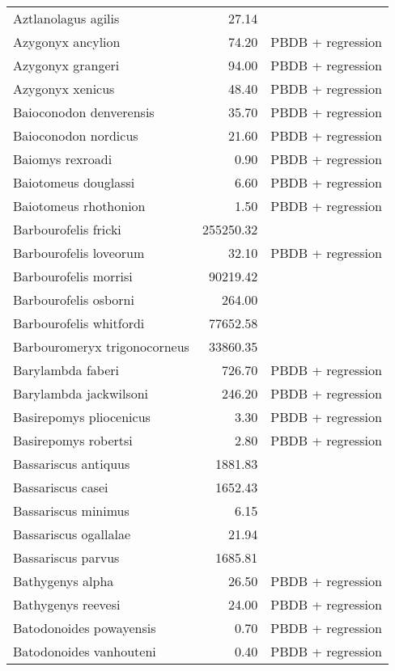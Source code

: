 \begin{table}[ht]
\begin{tabular}{lrl}
  Aztlanolagus agilis & 27.14 & \cite{Smith2004} \\ 
  Azygonyx ancylion & 74.20 & PBDB + regression \\ 
  Azygonyx grangeri & 94.00 & PBDB + regression \\ 
  Azygonyx xenicus & 48.40 & PBDB + regression \\ 
  Baioconodon denverensis & 35.70 & PBDB + regression \\ 
  Baioconodon nordicus & 21.60 & PBDB + regression \\ 
  Baiomys rexroadi & 0.90 & PBDB + regression \\ 
  Baiotomeus douglassi & 6.60 & PBDB + regression \\ 
  Baiotomeus rhothonion & 1.50 & PBDB + regression \\ 
  Barbourofelis fricki & 255250.32 & \cite{Tomiya2013} \\ 
  Barbourofelis loveorum & 32.10 & PBDB + regression \\ 
  Barbourofelis morrisi & 90219.42 & \cite{Tomiya2013} \\ 
  Barbourofelis osborni & 264.00 & \cite{Martin2002a} \\ 
  Barbourofelis whitfordi & 77652.58 & \cite{Tomiya2013} \\ 
  Barbouromeryx trigonocorneus & 33860.35 & \cite{Tomiya2013} \\ 
  Barylambda faberi & 726.70 & PBDB + regression \\ 
  Barylambda jackwilsoni & 246.20 & PBDB + regression \\ 
  Basirepomys pliocenicus & 3.30 & PBDB + regression \\ 
  Basirepomys robertsi & 2.80 & PBDB + regression \\ 
  Bassariscus antiquus & 1881.83 & \cite{Tomiya2013} \\ 
  Bassariscus casei & 1652.43 & \cite{Tomiya2013} \\ 
  Bassariscus minimus & 6.15 & \cite{Robinson1966} \\ 
  Bassariscus ogallalae & 21.94 & \cite{Gidley1920} \\ 
  Bassariscus parvus & 1685.81 & \cite{Tomiya2013} \\ 
  Bathygenys alpha & 26.50 & PBDB + regression \\ 
  Bathygenys reevesi & 24.00 & PBDB + regression \\ 
  Batodonoides powayensis & 0.70 & PBDB + regression \\ 
  Batodonoides vanhouteni & 0.40 & PBDB + regression \\ 

\end{tabular}
\end{table}

